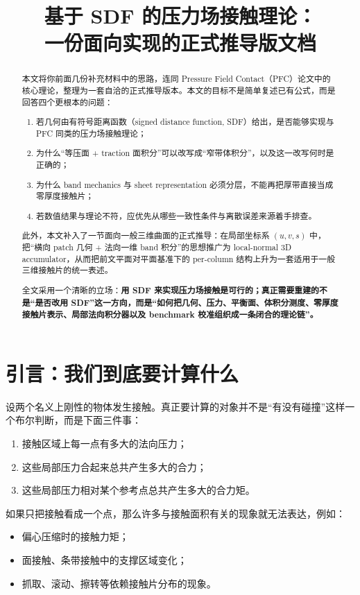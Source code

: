 \documentclass[12pt,a4paper]{ctexart}
\title{基于 SDF 的压力场接触理论：\\
一份面向实现的正式推导版文档}
\author{}
\date{}
\begin{document}
\maketitle

\begin{abstract}
本文将你前面几份补充材料中的思路，连同 Pressure Field Contact（PFC）论文中的核心理论，整理为一套自洽的正式推导版本。本文的目标不是简单复述已有公式，而是回答四个更根本的问题：
\begin{enumerate}
    \item 若几何由有符号距离函数（signed distance function, SDF）给出，是否能够实现与 PFC 同类的压力场接触理论；
    \item 为什么“等压面 + traction 面积分”可以改写成“窄带体积分”，以及这一改写何时是正确的；
    \item 为什么 band mechanics 与 sheet representation 必须分层，不能再把厚带直接当成零厚度接触片；
    \item 若数值结果与理论不符，应优先从哪些一致性条件与离散误差来源着手排查。
\end{enumerate}

此外，本文补入了一节面向一般三维曲面的正式推导：在局部坐标系 $(u,v,s)$ 中，把“横向 patch 几何 + 法向一维 band 积分”的思想推广为 local-normal 3D accumulator，从而把前文平面对平面基准下的 per-column 结构上升为一套适用于一般三维接触片的统一表述。

全文采用一个清晰的立场：\textbf{用 SDF 来实现压力场接触是可行的；真正需要重建的不是“是否改用 SDF”这一方向，而是“如何把几何、压力、平衡面、体积分测度、零厚度接触片表示、局部法向积分器以及 benchmark 校准组织成一条闭合的理论链”。}
\end{abstract}

\tableofcontents

\section{引言：我们到底要计算什么}

设两个名义上刚性的物体发生接触。真正要计算的对象并不是“有没有碰撞”这样一个布尔判断，而是下面三件事：
\begin{enumerate}
    \item 接触区域上每一点有多大的法向压力；
    \item 这些局部压力合起来总共产生多大的合力；
    \item 这些局部压力相对某个参考点总共产生多大的合力矩。
\end{enumerate}

如果只把接触看成一个点，那么许多与接触面积有关的现象就无法表达，例如：
\begin{itemize}
    \item 偏心压缩时的接触力矩；
    \item 面接触、条带接触中的支撑区域变化；
    \item 抓取、滚动、擦转等依赖接触片分布的现象。
\end{itemize}
\end{document}
